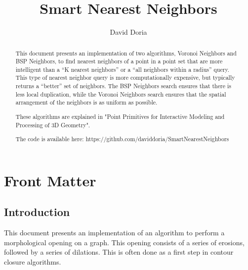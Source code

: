 \documentclass{InsightArticle}
\title{Smart Nearest Neighbors}
\author{David Doria}
\newcommand{\IJhandlerIDnumber}{3250}
\begin{document}
\IJhandlefooter{\IJhandlerIDnumber}


\ifpdf
\else
\fi


\maketitle


\ifhtml
\chapter*{Front Matter\label{front}}
\fi

\begin{abstract}
\noindent

This document presents an implementation of two algorithms, Voronoi Neighbors and BSP Neighbors, to find nearest neighbors of a point in a point set that are more intelligent than a ``K nearest neighbors'' or a ``all neighbors within a radius'' query. This type of nearest neighbor query is more computationally expensive, but typically returns a ``better'' set of neighbors. The BSP Neighbors search ensures that there is less local duplication, while the Voronoi Neighbors search ensures that the spatial arrangement of the neighbors is as uniform as possible.

These algorithms are explained in "Point Primitives for Interactive Modeling and Processing of 3D Geometry".

The code is available here:
https://github.com/daviddoria/SmartNearestNeighbors

\end{abstract}

\IJhandlenote{\IJhandlerIDnumber}

\tableofcontents
\section{Introduction}
This document presents an implementation of an algorithm to perform a morphological opening on a graph. This opening consists of a series of erosions, followed by a series of dilations. This is often done as a first step in contour closure algorithms.
\end{document}
